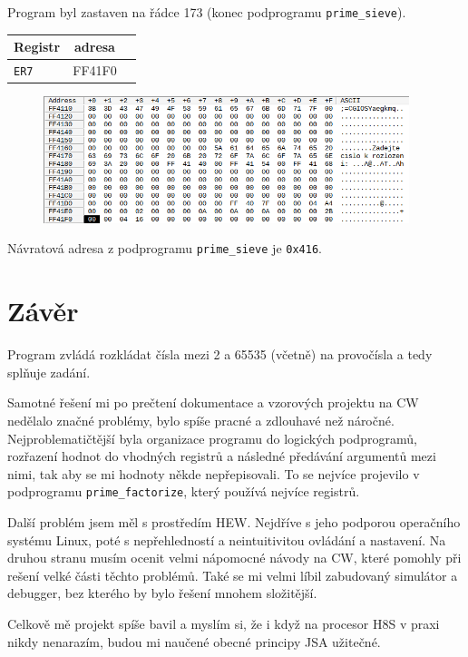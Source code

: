 \documentclass[12pt]{article}
\newcommand{\code}[1]{\mbox{\texttt{#1}}}
\begin{document}
Program byl zastaven na řádce 173 (konec podprogramu \code{prime\_sieve}).

\begin{table}[H]
	\centering
	\begin{tabular}{|l|c|r|}
		\hline
		Registr    & adresa \\ \hline
		\code{ER7} & FF41F0 \\ \hline
	\end{tabular}
\end{table}

\begin{figure}[H]
	\begin{center}
		\includegraphics[width=0.95\textwidth]{pic/memory.png}
	\end{center}
\end{figure}

Návratová adresa z podprogramu \code{prime\_sieve} je \code{0x416}.

\section{Závěr}

Program zvládá rozkládat čísla mezi 2 a 65535 (včetně) na provočísla a tedy
splňuje zadání.

Samotné řešení mi po prečtení dokumentace a vzorových projektu na CW nedělalo
značné problémy, bylo spíše pracné a zdlouhavé než náročné. Nejproblematičtější
byla organizace programu do logických podprogramů, rozřazení hodnot do vhodných
registrů a následné předávání argumentů mezi nimi, tak aby se mi hodnoty někde
nepřepisovali. To se nejvíce projevilo v podprogramu \code{prime\_factorize},
který používá nejvíce registrů.

Další problém jsem měl s prostředím HEW. Nejdříve s jeho podporou operačního
systému Linux, poté s nepřehledností a neintuitivitou ovládání a nastavení. Na
druhou stranu musím ocenit velmi nápomocné návody na CW, které pomohly při
rešení velké části těchto problémů. Také se mi velmi líbil zabudovaný simulátor
a debugger, bez kterého by bylo řešení mnohem složitější.

Celkově mě projekt spíše bavil a myslím si, že i když na procesor H8S v praxi
nikdy nenarazím, budou mi naučené obecné principy JSA užitečné.
\end{document}
